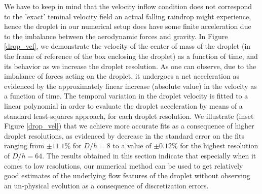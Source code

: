 We have to keep in mind that the velocity inflow condition does not correspond to the 'exact' teminal velocity field an actual falling raindrop might experience, hence the droplet in our numerical setup does have some finite acceleration due to the imbalance between the aerodynamic forces and gravity. In Figure \ref{drop_vel}, we demonstrate the velocity of the center of mass of the droplet (in the frame of reference of the box enclosing the droplet) as a function of time, and its behavior as we increase the droplet resolution. As one can observe, due to the imbalance of forces acting on the droplet, it undergoes a net acceleration as evidenced by the approximately linear increase (absolute value) in the velocity as a function of time. The temporal variation in the droplet velocity is fitted to a linear polynomial in order to evaluate the droplet acceleration by means of a standard least-squares approach, for each droplet resolution. We illustrate (inset Figure \ref{drop_vel}) that we achieve more accurate fits as a consequence of higher droplet resolutions, as evidenced by decrease in the standard error on the fits ranging from $\pm 11.1 \%$ for $D/h = 8$ to a value of $\pm 0.12 \%$ for the highest resolution of $D/h = 64$. The results obtained in this section indicate that especially when it comes to low resolutions, our numerical method can be used to get relatively good estimates of the underlying flow features of the droplet without observing an un-physical evolution as a consequence of discretization errors.           


%

